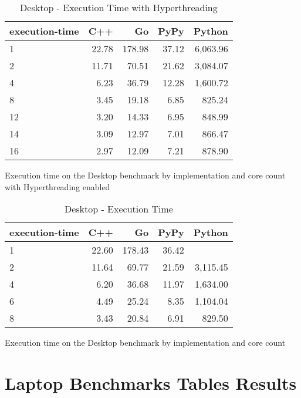 \begin{table}[H]
 \centering
    \begin{tabular}{lrrrr}
    \hline
    execution-time & C++ & Go & PyPy & Python \\
    \hline
    1 & 22.78 & 178.98 & 37.12 & 6,063.96 \\
    2 & 11.71 & 70.51 & 21.62 & 3,084.07 \\
    4 & 6.23 & 36.79 & 12.28 & 1,600.72 \\
    8 & 3.45 & 19.18 & 6.85 & 825.24 \\
    12 & 3.20 & 14.33 & 6.95 & 848.99 \\
    14 & 3.09 & 12.97 & 7.01 & 866.47 \\
    16 & 2.97 & 12.09 & 7.21 & 878.90 \\
    \hline
    \end{tabular}
\caption{Desktop - Execution Time with Hyperthreading}{Execution time on the Desktop benchmark by implementation and core count with Hyperthreading enabled}
\label{tab:desktop-execution-time-hyperthreading}
\end{table}

\begin{table}[H]
    \centering
    \begin{tabular}{lrrrr}
        \hline
        execution-time & C++                 & Go          & PyPy       & Python              \\
        \hline
        1              & 22.60               & 178.43      & 36.42      &                    \\
        2              & 11.64               & 69.77       & 21.59      & 3,115.45           \\
        4              & 6.20                & 36.68       & 11.97      & 1,634.00           \\
        6              & 4.49                & 25.24       & 8.35       & 1,104.04           \\
        8	           & 3.43                & 20.84       & 6.91       & 829.50             \\
        \hline
    \end{tabular}
\caption{Desktop - Execution Time}{Execution time on the Desktop benchmark by implementation and core count}
\label{tab:desktop-execution-time}
\end{table}

\chapter{Laptop Benchmarks Tables Results}

